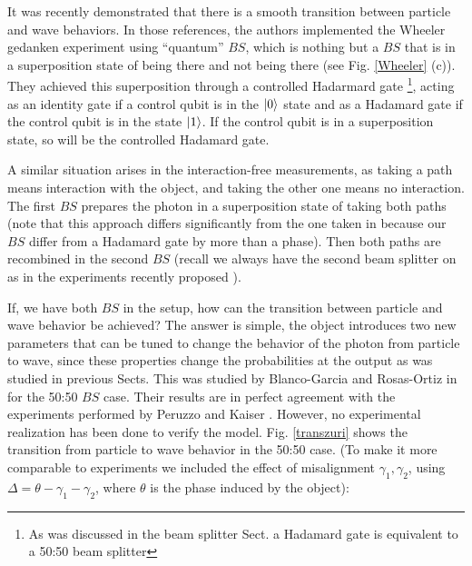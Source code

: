 \documentclass[12pt]{book}
\begin{document}
It was recently demonstrated \cite{Peruzzo, Kaiser2012} that there is a smooth transition between particle and wave behaviors. In those references, the authors implemented the Wheeler gedanken experiment using ``quantum'' $BS$, which is nothing but a $BS$ that is in a superposition state of being there and not being there (see Fig. \ref{Wheeler} (c)). They achieved this superposition through a controlled Hadarmard gate \footnote{As was discussed in the beam splitter Sect. a Hadamard gate is equivalent to a 50:50 beam splitter}, acting as an identity gate if a control qubit is in the $\ket{0}$ state and as a Hadamard gate if the control qubit is in the state $\ket{1}$.  If the control qubit is in a superposition state, so will be the controlled Hadamard gate.




A similar situation arises in the interaction-free measurements, as taking a path means interaction with the object, and taking the other one means no interaction. The first $BS$ prepares the photon in a superposition state of taking both paths (note that this approach differs significantly from the one taken in \cite{Peruzzo,Kaiser2012} because our $BS$ differ from a Hadamard gate by more than a phase). Then both paths are recombined in the second $BS$ (recall we always have the second beam splitter on as in the experiments recently proposed \cite{Polino}).


If, we have both $BS$ in the setup, how can the transition between particle and wave behavior be achieved? The answer is simple, the object introduces two new parameters that can be tuned to change the behavior of the photon from particle to wave, since these properties change the probabilities at the output as was studied in previous Sects. This was studied by Blanco-Garcia and  Rosas-Ortiz in \cite{azuri} for the 50:50 $BS$ case. Their results are in perfect agreement with the experiments performed by Peruzzo \cite{Peruzzo} and Kaiser \cite{Kaiser2012}. However, no experimental realization has been done to verify the model. Fig. \ref{transzuri} shows the transition from particle to wave behavior in the 50:50 case. (To make it more comparable to experiments we included the effect of misalignment $\gamma_{1},\gamma_{2}$, using $\Delta=\theta-\gamma_{1}-\gamma_{2}$, where $\theta$ is the phase induced by the object):
\end{document}
